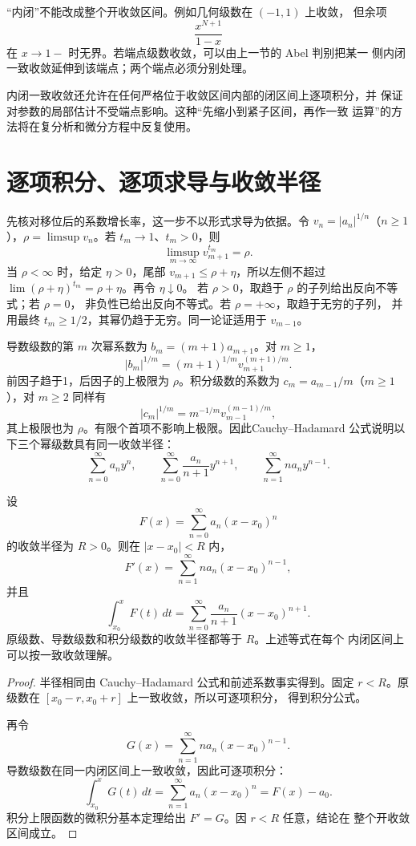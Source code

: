 “内闭”不能改成整个开收敛区间。例如几何级数在 \((-1,1)\) 上收敛，
但余项
\[
 \frac{x^{N+1}}{1-x}
\]
在 \(x\to1-\) 时无界。若端点级数收敛，可以由上一节的 Abel 判别把某一
侧内闭一致收敛延伸到该端点；两个端点必须分别处理。

内闭一致收敛还允许在任何严格位于收敛区间内部的闭区间上逐项积分，并
保证对参数的局部估计不受端点影响。这种“先缩小到紧子区间，再作一致
运算”的方法将在复分析和微分方程中反复使用。

\section{逐项积分、逐项求导与收敛半径}

先核对移位后的系数增长率，这一步不以形式求导为依据。令
\(v_n=|a_n|^{1/n}\)（\(n\ge1\)），\(\rho=\limsup v_n\)。若
\(t_m\to1\)、\(t_m>0\)，则
\[
 \limsup_{m\to\infty}v_{m+1}^{t_m}=\rho.
\]
当 \(\rho<\infty\) 时，给定 \(\eta>0\)，尾部
\(v_{m+1}\le\rho+\eta\)，所以左侧不超过
\(\lim(\rho+\eta)^{t_m}=\rho+\eta\)。再令 \(\eta\downarrow0\)。
若 \(\rho>0\)，取趋于 \(\rho\) 的子列给出反向不等式；若 \(\rho=0\)，
非负性已给出反向不等式。若 \(\rho=+\infty\)，取趋于无穷的子列，
并用最终 \(t_m\ge1/2\)，其幂仍趋于无穷。同一论证适用于 \(v_{m-1}\)。

导数级数的第 \(m\) 次幂系数为 \(b_m=(m+1)a_{m+1}\)。对 \(m\ge1\)，
\[
 |b_m|^{1/m}=(m+1)^{1/m}v_{m+1}^{(m+1)/m}.
\]
前因子趋于1，后因子的上极限为 \(\rho\)。积分级数的系数为
\(c_m=a_{m-1}/m\)（\(m\ge1\)），对 \(m\ge2\) 同样有
\[
 |c_m|^{1/m}=m^{-1/m}v_{m-1}^{(m-1)/m},
\]
其上极限也为 \(\rho\)。有限个首项不影响上极限。因此Cauchy--Hadamard
公式说明以下三个幂级数具有同一收敛半径：
\[
 \sum_{n=0}^\infty a_ny^n,\qquad
 \sum_{n=0}^\infty\frac{a_n}{n+1}y^{n+1},\qquad
 \sum_{n=1}^\infty na_ny^{n-1}.
\]

\begin{theorem}[幂级数的逐项微积分]
\label{thm:power-series-calculus}
设
\[
 F(x)=\sum_{n=0}^\infty a_n(x-x_0)^n
\]
的收敛半径为 \(R>0\)。则在 \(|x-x_0|<R\) 内，
\[
 F'(x)=\sum_{n=1}^\infty na_n(x-x_0)^{n-1},
\]
并且
\[
 \int_{x_0}^xF(t)\,dt
 =\sum_{n=0}^\infty\frac{a_n}{n+1}(x-x_0)^{n+1}.
\]
原级数、导数级数和积分级数的收敛半径都等于 \(R\)。上述等式在每个
内闭区间上可以按一致收敛理解。
\end{theorem}

\begin{proof}
半径相同由 Cauchy--Hadamard 公式和前述系数事实得到。固定
\(r<R\)。原级数在 \([x_0-r,x_0+r]\) 上一致收敛，所以可逐项积分，
得到积分公式。

再令
\[
 G(x)=\sum_{n=1}^\infty na_n(x-x_0)^{n-1}.
\]
导数级数在同一内闭区间上一致收敛，因此可逐项积分：
\[
 \int_{x_0}^xG(t)\,dt
 =\sum_{n=1}^\infty a_n(x-x_0)^n
 =F(x)-a_0.
\]
积分上限函数的微积分基本定理给出 \(F'=G\)。因 \(r<R\) 任意，结论在
整个开收敛区间成立。
\end{proof}

